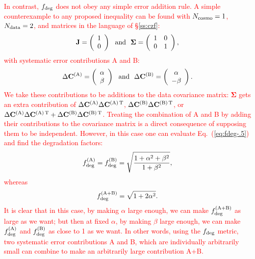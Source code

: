 \documentclass[usenatbib]{mnras}
\newcommand{\changetext}[1]{\textcolor{red}{#1}}
\begin{document}
\changetext{In contrast, $f_{\rm deg}$ does not obey any simple error addition rule. A simple counterexample to any proposed inequality can be found with $N_{\rm cosmo}=1$, $N_{\rm data}=2$, and matrices in the language of \S\ref{ss:czf}:
\begin{equation}
{\bf J} = \left( \begin{array}c 1 \\ 0 \end{array} \right) ~~{\rm and}~~
{\boldsymbol\Sigma} = \left( \begin{array}{cc} 1 & 0 \\ 0 & 1 \end{array} \right),
\end{equation}
with systematic error contributions A and B:
\begin{equation}
\Delta{\bf C}^{(\rm A)} =  \left( \begin{array}c \alpha \\ \beta \end{array} \right) ~~{\rm and}~~
\Delta{\bf C}^{(\rm B)} =  \left( \begin{array}c \alpha \\ -\beta \end{array} \right).
\end{equation}
We take these contributions to be additions to the data covariance matrix: ${\boldsymbol\Sigma}$ gets an extra contribution of $\Delta{\bf C}^{(\rm A)}\Delta{\bf C}^{(\rm A)\,T}$, $\Delta{\bf C}^{(\rm B)}\Delta{\bf C}^{(\rm B)\,T}$, or $\Delta{\bf C}^{(\rm A)}\Delta{\bf C}^{(\rm A)\,T} + \Delta{\bf C}^{(\rm B)}\Delta{\bf C}^{(\rm B)\,T}$. Treating the combination of A and B by adding their contributions to the covariance matrix is a direct consequence of supposing them to be independent. However, in this case one can evaluate Eq.~(\ref{eq:fdeg-.5}) and find the degradation factors:
\begin{equation}
f_{\rm deg}^{(\rm A)} = f_{\rm deg}^{(\rm B)} = \sqrt{\frac{ 1 + \alpha^2 + \beta^2 }{ 1 + \beta^2 }},
\end{equation}
whereas
\begin{equation}
f_{\rm deg}^{(\rm A+B)} = \sqrt{1 + 2\alpha^2}.
\end{equation}
It is clear that in this case, by making $\alpha$ large enough, we can make $f_{\rm deg}^{(\rm A+B)}$ as large as we want; but then at fixed $\alpha$, by making $\beta$ large enough, we can make $f_{\rm deg}^{(\rm A)}$ and $f_{\rm deg}^{(\rm B)}$ as close to 1 as we want. In other words, using the $f_{\rm deg}$ metric, two systematic error contributions A and B, which are individually arbitrarily small can combine to make an arbitrarily large contribution A+B.}
\end{document}

